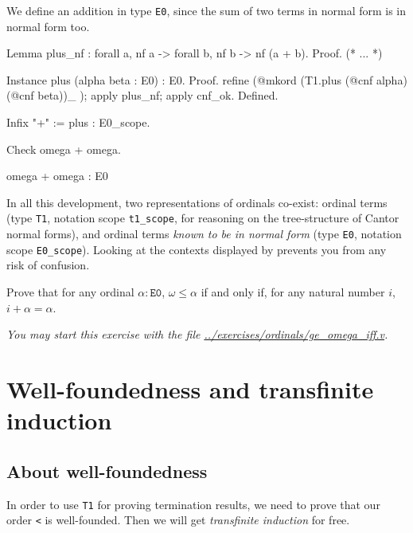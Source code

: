  We define an addition in type \texttt{E0}, since the sum of two terms in normal form is in normal form too.


\begin{Coqsrc}
Lemma plus_nf : forall a,  nf a -> forall b, nf b -> nf (a + b).
Proof.
 (* ... *)

Instance plus (alpha beta : E0) : E0.
Proof.
  refine (@mkord (T1.plus (@cnf alpha) (@cnf beta))_ );
    apply plus_nf; apply cnf_ok.
Defined.

Infix "+" := plus : E0_scope.

Check omega + omega.
\end{Coqsrc}

\begin{Coqanswer}
omega + omega
     : E0
\end{Coqanswer}

\begin{remark}
In all this development, two representations of ordinals co-exist: ordinal terms (type \texttt{T1}, notation scope \texttt{t1\_scope}, for reasoning on the tree-structure of Cantor normal forms), and ordinal terms \emph{known to be in normal form} (type \texttt{E0}, notation scope \texttt{E0\_scope}). Looking at the contexts displayed by \coq{} prevents you from any risk of confusion.
\end{remark}

\begin{exercise}
Prove that for any ordinal $\alpha:\texttt{E0}$, 
$\omega\leq \alpha$ if and only if, for any natural number $i$,
$i+\alpha=\alpha$.

\emph{You may start this exercise with the file
\url{../exercises/ordinals/ge_omega_iff.v}.}
\end{exercise}

\section{Well-foundedness and transfinite induction}


\subsection{About  well-foundedness}
\label{sec:orgheadline82}
   In order to use \texttt{T1} for proving termination results,
we need to prove that  our order \texttt{<} is well-founded. Then we will get \emph{transfinite induction} for free.


